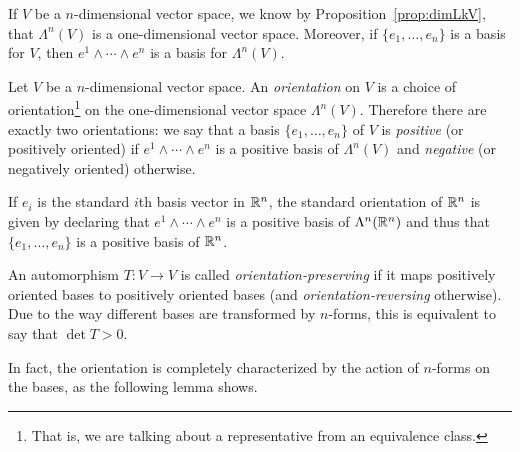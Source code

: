 If $V$ be a $n$-dimensional vector space, we know by Proposition~\ref{prop:dimLkV}, that $\Lambda^n(V)$ is a one-dimensional vector space.
Moreover, if $\{e_1,\ldots,e_n\}$ is a basis for $V$, then $e^1\wedge\cdots\wedge e^n$ is a basis for $\Lambda^n(V)$.

\begin{definition}
  Let $V$ be a $n$-dimensional vector space.
  An \emph{orientation} on $V$ is a choice of orientation\footnote{That is, we are talking about a representative from an equivalence class.} on the one-dimensional vector space $\Lambda^n(V)$.
  Therefore there are exactly two orientations: we say that a basis $\{e_1,\ldots,e_n\}$ of $V$ is \emph{positive} (or positively oriented) if $e^1\wedge\cdots\wedge e^n$ is a positive basis of $\Lambda^n(V)$ and \emph{negative} (or negatively oriented) otherwise.
\end{definition}

\begin{example}
  If $e_i$ is the standard $i$th basis vector in $\mathbb{R}^n$, the standard orientation of $\mathbb{R}^n$ is given by declaring that $e^1\wedge\cdots\wedge e^n$ is a positive basis of $\Lambda^n(\mathbb{R}^n)$ and thus that $\{e_1,\ldots,e_n\}$ is a positive basis of $\mathbb{R}^n$.
\end{example}

An automorphism $T:V\to V$ is called \emph{orientation-preserving} if it maps positively oriented bases to positively oriented bases (and \emph{orientation-reversing} otherwise).
Due to the way different bases are transformed by $n$-forms, this is equivalent to say that $\det T > 0$.


In fact, the orientation is completely characterized by the action of $n$-forms on the bases, as the following lemma shows.

